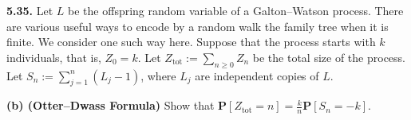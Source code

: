 \textbf{5.35.} Let $L$ be the offspring random variable of a Galton--Watson process. There are various useful ways to encode by a random walk the family tree when it is finite. We consider one such way here. Suppose that the process starts with $k$ individuals, that is, $Z_0=k$. Let $Z_{\mathrm{tot}}:=\sum_{n\ge 0}Z_n$ be the total size of the process. Let $S_n:=\sum_{j=1}^n(L_j-1)$, where $L_j$ are independent copies of $L$.

\textbf{(b) (Otter--Dwass Formula)} Show that $\mathbf{P}[Z_{\mathrm{tot}}=n]=\frac{k}{n}\mathbf{P}[S_n=-k]$.
